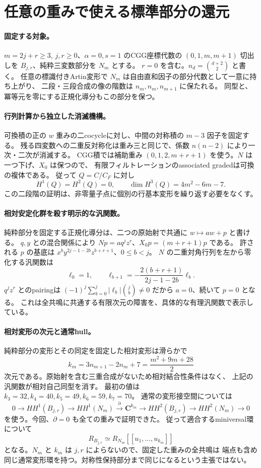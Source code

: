 \section{任意の重みで使える標準部分の還元}
\label{sec:notes-all-weight-filtered-v40}

\paragraph{固定する対象。}
$m=2j+r\ge3$, $j,r\ge0$、$\alpha=0,s=1$ のCGG座標代数の
$(0,1,m,m+1)$ 切出しを $B_{j,r}$、純粋三変数部分を $N_m$ とする。
$r=0$ を含む。$n_d=\binom{d+2}{2}$ と書く。
任意の標識付きArtin変形で $N_m$ は自由直和因子の部分代数として一意に持ち上がり、
二段・三段合成の像の階数は $n_m,n_m,n_{m+1}$ に保たれる。
同型と、冪等元を零にする正規化導分もこの部分を保つ。

\paragraph{行列計算から独立した消滅機構。}
可換積の正の $w$ 重みの二cocycleに対し、中間の対称積の $m-3$ 因子を固定する。
残る四変数への二重反対称化は重み三と同じで、係数 $n(n-2)$ により一次・二次が消滅する。
CGG積では補助重み $(0,1,2,m+r+1)$ を使う。$N$ は一つ下げ、$X_0$ は保つので、
有限フィルトレーションのassociated gradedは可換の複体である。
従って $Q=C/C_F$ に対し
\[
 H^1(Q)=H^2(Q)=0,\qquad \dim H^3(Q)=4m^2-6m-7.
\]
この二段階の証明は、非零量子点に個別の行基本変形を繰り返す必要をなくす。

\paragraph{相対安定化群を殺す明示的な汎関数。}
純粋部分を固定する正規化導分は、二つの原始射で共通に $w\mapsto aw+p$ と書ける。
$q,y$ との混合関係により
$Np=aq^jz^r$、$X_0p=(m+r+1)p$ である。
許される $p$ の基底は
$x^b y^{2j-1-2b}z^{b+r+1}$、$0\le b<j$。
$N$ の二重対角行列を左から零化する汎関数は
\[
 \ell_0=1,\qquad
 \ell_{b+1}=-\frac{2(b+r+1)}{2j-1-2b}\ell_b.
\]
$q^jz^r$ とのpairingは
$(-1)^j\sum_{b=0}^j|\ell_b|\binom jb\ne0$ だから $a=0$、続いて $p=0$ となる。
これは全共鳴に共通する有限次元の障害を、具体的な有理汎関数で表示している。

\paragraph{相対変形の次元と通常hull。}
純粋部分の変形とその同定を固定した相対変形は滑らかで
\[
 k_m=3n_{m+1}-2n_m+7=\frac{m^2+9m+28}{2}
\]
次元である。原始射を含む三重合成がないため相対結合性条件はなく、
上記の汎関数が相対自己同型を消す。
最初の値は $k_3=32,k_4=40,k_5=49,k_6=59,k_7=70$。
通常の変形接空間については
\[
 0\to HH^1(B_{j,r})\to HH^1(N_m)
 \xrightarrow{\partial}\mathbf C^{k_m}
 \to HH^2(B_{j,r})\to HH^2(N_m)\to0
\]
を使う。今回、$\partial=0$ も全ての重みで証明できた。
従って適合するminiversal環について
\[
 R_{B_{j,r}}\simeq R_{N_m}[[u_1,\ldots,u_{k_m}]]
\]
となる。$N_m$ と $k_m$ は $j,r$ によらないので、固定した重みの全共鳴は
端点も含め同じ通常変形環を持つ。対称性保持部分まで同じになるという主張ではない。

